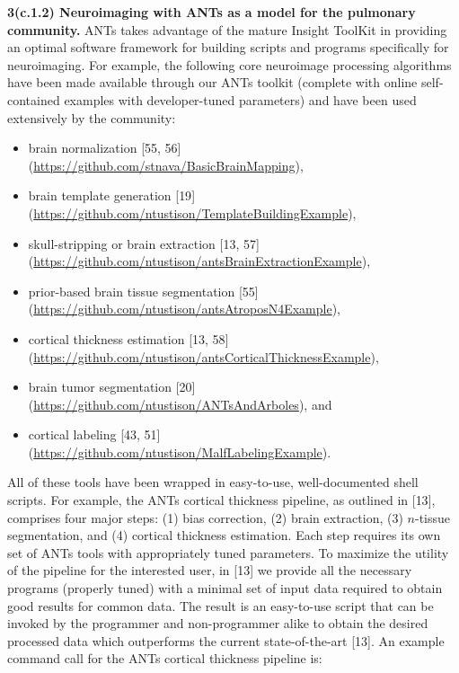 \documentclass[11pt,]{article}
\providecommand{\tightlist}{%
  \setlength{\itemsep}{0pt}\setlength{\parskip}{0pt}}
\begin{document}
\textbf{3(c.1.2) Neuroimaging with ANTs as a model for the pulmonary
community.} ANTs takes advantage of the mature Insight ToolKit in
providing an optimal software framework for building scripts and
programs specifically for neuroimaging. For example, the following core
neuroimage processing algorithms have been made available through our
ANTs toolkit (complete with online self-contained examples with
developer-tuned parameters) and have been used extensively by the
community:

\begin{itemize}
\tightlist
\item
  brain normalization {[}55, 56{]}
  (\url{https://github.com/stnava/BasicBrainMapping}),
\item
  brain template generation {[}19{]}
  (\url{https://github.com/ntustison/TemplateBuildingExample}),
\item
  skull-stripping or brain extraction {[}13, 57{]}
  (\url{https://github.com/ntustison/antsBrainExtractionExample}),
\item
  prior-based brain tissue segmentation {[}55{]}
  (\url{https://github.com/ntustison/antsAtroposN4Example}),
\item
  cortical thickness estimation {[}13, 58{]}
  (\url{https://github.com/ntustison/antsCorticalThicknessExample}),
\item
  brain tumor segmentation {[}20{]}
  (\url{https://github.com/ntustison/ANTsAndArboles}), and
\item
  cortical labeling {[}43, 51{]}
  (\url{https://github.com/ntustison/MalfLabelingExample}).
\end{itemize}

All of these tools have been wrapped in easy-to-use, well-documented
shell scripts. For example, the ANTs cortical thickness pipeline, as
outlined in {[}13{]}, comprises four major steps: (1) bias correction,
(2) brain extraction, (3) \(n\)-tissue segmentation, and (4) cortical
thickness estimation. Each step requires its own set of ANTs tools with
appropriately tuned parameters. To maximize the utility of the pipeline
for the interested user, in {[}13{]} we provide all the necessary
programs (properly tuned) with a minimal set of input data required to
obtain good results for common data. The result is an easy-to-use script
that can be invoked by the programmer and non-programmer alike to obtain
the desired processed data which outperforms the current
state-of-the-art {[}13{]}. An example command call for the ANTs cortical
thickness pipeline is:
\end{document}
